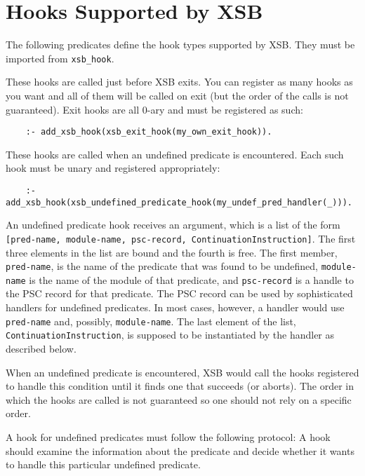 \section{Hooks Supported by XSB}

The following predicates define the hook types supported by XSB. They must
be imported from {\tt xsb\_hook}.

\begin{description}
 

These hooks are called just before XSB exits. You can register as many
hooks as you want and all of them will be called on exit (but the order of
the calls is not guaranteed). Exit hooks are all 0-ary and must be registered
as such:
\begin{verbatim}
    :- add_xsb_hook(xsb_exit_hook(my_own_exit_hook)).
\end{verbatim}


These hooks are called when an undefined predicate is encountered.
Each such hook must be unary and registered appropriately:
\begin{verbatim}
    :- add_xsb_hook(xsb_undefined_predicate_hook(my_undef_pred_handler(_))).
\end{verbatim}
An undefined predicate hook receives an argument, which is a list of the
form {\tt [pred-name, module-name, psc-record, ContinuationInstruction]}.
The first three elements in the list are bound and the fourth is free.  The
first member, {\tt pred-name}, is the name of the predicate that was found
to be undefined, {\tt module-name} is the name of the module of that
predicate, and {\tt psc-record} is a handle to the PSC record for that
predicate. The PSC record can be used by sophisticated handlers for
undefined predicates. In most cases, however, a handler would use {\tt
  pred-name} and, possibly, {\tt module-name}.  The last element of the
list, {\tt ContinuationInstruction}, is supposed to be instantiated by the
handler as described below.

When an undefined predicate is encountered, XSB would call the hooks
registered to handle this condition until it finds one that succeeds (or
aborts). The order in which the hooks are called is not guaranteed so one
should not rely on a specific order.

A hook for undefined predicates must follow the following protocol: A hook
should examine the information about the predicate and decide whether it
wants to handle this particular undefined predicate.


\end{description}
